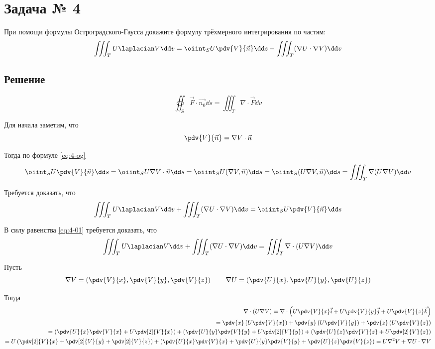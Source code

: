 \section{Задача № 4}

При помощи формулы Остроградского-Гаусса докажите формулу трёхмерного
интегрирования по частям:
\[
  \iiint_{T} U \laplacian V \dd v
  = \oiint_{S} U \pdv{V}{\vec{n}} \dd s
  - \iiint_{T} (\nabla U \cdot \nabla V) \dd v
\]

\subsection{Решение}

\begin{equation}\label{eq:4-og}
  \tag{Формула Гаусса-Остроградского}
  \oiint_{S} \vec{F} \cdot \vec{n_0} \dd s
  = \iiint_{T} \nabla \cdot \vec{F} \dd v
\end{equation}

Для начала заметим, что
\[
  \pdv{V}{\vec{n}} = \nabla V \cdot \vec{n}
\]

Тогда по формуле \ref{eq:4-og}
\begin{equation}\label{eq:4-01}
  \oiint_{S} U \pdv{V}{\vec{n}} \dd s
  = \oiint_{S} U \nabla V \cdot \vec{n} \dd s
  = \oiint_{S} U (\nabla V, \vec{n}) \dd s
  = \oiint_{S} (U \nabla V, \vec{n}) \dd s
  = \iiint_{T} \nabla (U \nabla V) \dd v
\end{equation}

Требуется доказать, что
\[
  \iiint_{T} U \laplacian V \dd v
  + \iiint_{T} (\nabla U \cdot \nabla V) \dd v
  = \oiint_{S} U \pdv{V}{\vec{n}} \dd s
\]

В силу равенства \ref{eq:4-01} требуется доказать, что
\[
  \iiint_{T} U \laplacian V \dd v
  + \iiint_{T} (\nabla U \cdot \nabla V) \dd v
  = \iiint_{T} \nabla \cdot (U \nabla V) \dd v
\]

Пусть
\[
  \nabla V
  = \left(\pdv{V}{x}, \pdv{V}{y}, \pdv{V}{z}\right) \qquad
  \nabla U
  = \left(\pdv{U}{x}, \pdv{U}{y}, \pdv{U}{z}\right)
\]

Тогда
\[
\begin{split}
  \nabla \cdot (U \nabla V)
  = \nabla \cdot \left(U \pdv{V}{x} \vec{i} + U \pdv{V}{y} \vec{j} + U \pdv{V}{z} \vec{k}\right) \\
  = \pdv{x} \left(U \pdv{V}{x}\right)
  + \pdv{y} \left(U \pdv{V}{y}\right)
  + \pdv{z} \left(U \pdv{V}{z}\right) \\
  = \left(\pdv{U}{x} \pdv{V}{x} + U \pdv[2]{V}{x}\right)
  + \left(\pdv{U}{y} \pdv{V}{y} + U \pdv[2]{V}{y}\right)
  + \left(\pdv{U}{z} \pdv{V}{z} + U \pdv[2]{V}{z}\right) \\
  = U\left(\pdv[2]{V}{x} + \pdv[2]{V}{y} + \pdv[2]{V}{z}\right)
  + \left(\pdv{U}{x} \pdv{V}{x} + \pdv{U}{y} \pdv{V}{y} + \pdv{U}{z} \pdv{V}{z}\right)
  = U \nabla^2 V + \nabla U \cdot \nabla V
\end{split}
\]

